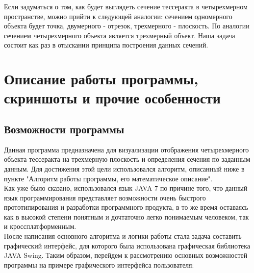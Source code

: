 \documentclass[12pt, a4paper, twoside]{report}
\begin{document}
Если задуматься о том, как будет выглядеть сечение тессеракта в четырехмерном пространстве, можно прийти к следующей аналогии: сечением одномерного объекта будет точка, двумерного -  отрезок, трехмерного - плоскость. По аналогии сечением четырехмерного объекта является трехмерный объект. Наша задача состоит как раз в отыскании принципа построения данных сечений.

\section{Описание работы программы, скриншоты и прочие особенности}
\subsection{Возможности программы}
Данная программа предназначена для визуализации отображения четырехмерного объекта тессеракта на трехмерную плоскость и определения сечения по заданным данным. Для достижения этой цели использовался алгоритм, описанный ниже в пункте "Алгоритм работы программы, его математическое описание". \\
Как уже было сказано, использовался язык JAVA 7 по причине того, что данный язык программирования представляет возможности очень быстрого прототипирования и разработки программного продукта, в то же время оставаясь как в высокой степени понятным и дочтаточно легко понимаемым человеком, так и кроссплатформенным. \\
После написания основного алгоритма и логики работы стала задача составить графический интерфейс, для которого была использована графическая библиотека JAVA Swing. Таким образом, перейдем к рассмотрению основных возможностей программы на примере графического интерфейса пользователя:
\\

\end{document}
